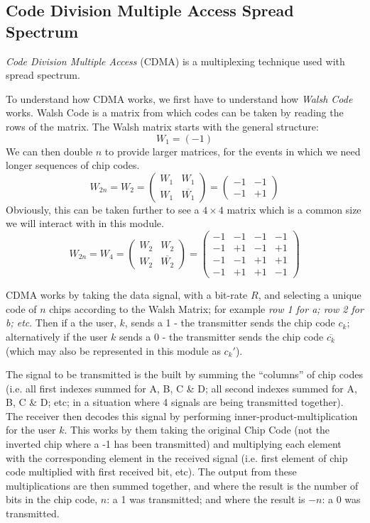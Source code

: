 \subsection{Code Division Multiple Access Spread Spectrum}
\textit{Code Division Multiple Access} (CDMA) is a multiplexing technique used with spread spectrum.

To understand how CDMA works, we first have to understand how \textit{Walsh Code} works. Walsh Code is a matrix from which codes can be taken by reading the rows of the matrix. The Walsh matrix starts with the general structure:
\[W_1=(-1)\]
We can then double $n$ to provide larger matrices, for the events in which we need longer sequences of chip codes.
\begin{equation*}
W_{2n} = W_2 =
\begin{pmatrix}
    W_1 & W_1\\
    W_1 & \overline{W_1}
\end{pmatrix}
=
\begin{pmatrix}
    -1 & -1\\
    -1 & +1
\end{pmatrix}
\end{equation*}
Obviously, this can be taken further to see a $4\times4$ matrix which is a common size we will interact with in this module.
\begin{equation*}
W_{2n} = W_4 = 
\begin{pmatrix}
    W_2 & W_2 \\
    W_2 & \overline{W_2}
\end{pmatrix}
=
\begin{pmatrix}
    -1 & -1 & -1 & -1\\
    -1 & +1 & -1 & +1\\
    -1 & -1 & +1 & +1\\
    -1 & +1 & +1 & -1
\end{pmatrix}
\end{equation*}

CDMA works by taking the data signal, with a bit-rate $R$, and selecting a unique code of $n$ chips according to the Walsh Matrix; for example \textit{row 1 for a; row 2 for b; etc}. Then if a the user, $k$, sends a 1 - the transmitter sends the chip code $c_k$; alternatively if the user $k$ sends a 0 - the transmitter sends the chip code $\overline{c_k}$ (which may also be represented in this module as $c_k'$).

The signal to be transmitted is the built by summing the ``columns'' of chip codes (i.e. all first indexes summed for A, B, C \& D; all second indexes summed for A, B, C \& D; etc; in a situation where 4 signals are being transmitted together). The receiver then decodes this signal by performing inner-product-multiplication for the user $k$. This works by them taking the original Chip Code (not the inverted chip where a -1 has been transmitted) and multiplying each element with the corresponding element in the received signal (i.e. first element of chip code multiplied with first received bit, etc). The output from these multiplications are then summed together, and where the result is the number of bits in the chip code, $n$: a 1 was transmitted; and where the result is $-n$: a 0 was transmitted. 

